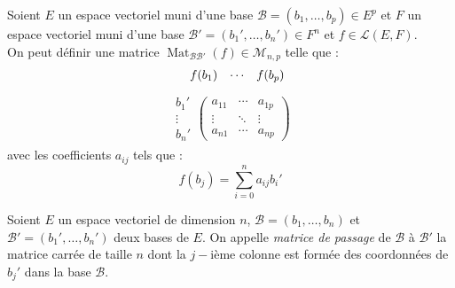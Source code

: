 \begin{definition}
    Soient $E$ un espace vectoriel muni d'une base $\mathcal{B} = (b_1, \ldots, b_p) \in E^p$ et $F$ un espace vectoriel muni d'une base $\mathcal{B}' = (b_1', \ldots, b_n') \in F^n$ et $f \in \mathcal{L}(E, F)$.
    \\
    On peut définir une matrice $\operatorname{Mat}_{\mathcal{B}\mathcal{B}'} (f) \in \mathcal{M}_{n,p}$ telle que :
    \begin{align*}
        \hspace{0.4cm}
        \begin{matrix}
            f(b_1) & \cdots & f(b_p) 
        \end{matrix}
    \end{align*}
    \vspace{-0.8cm}
    \begin{align*}
        \begin{matrix}
            b_1' \\
            \vdots \\ 
            b_n'
        \end{matrix}
        \begin{pmatrix}
            a_{11} & \cdots & a_{1p} \\
            \vdots & \ddots & \vdots \\ 
            a_{n1} & \cdots & a_{np}
        \end{pmatrix}
    \end{align*}
    avec les coefficients $a_{ij}$ tels que : 
    \[ f(b_j) = \sum_{i = 0}^n a_{ij} b_i' \]
\end{definition}

\begin{definition}
    Soient $E$ un espace vectoriel de dimension $n$, $\mathcal{B} = (b_1, \ldots, b_n)$ et $\mathcal{B}' = (b_1', \ldots, b_n')$ deux bases de $E$. On appelle \emph{matrice de passage} de $\mathcal{B}$ à $\mathcal{B}'$ la matrice carrée de taille $n$ dont la $j-$ième colonne est formée des coordonnées de $b_j'$ dans la base $\mathcal{B}$.
\end{definition}

